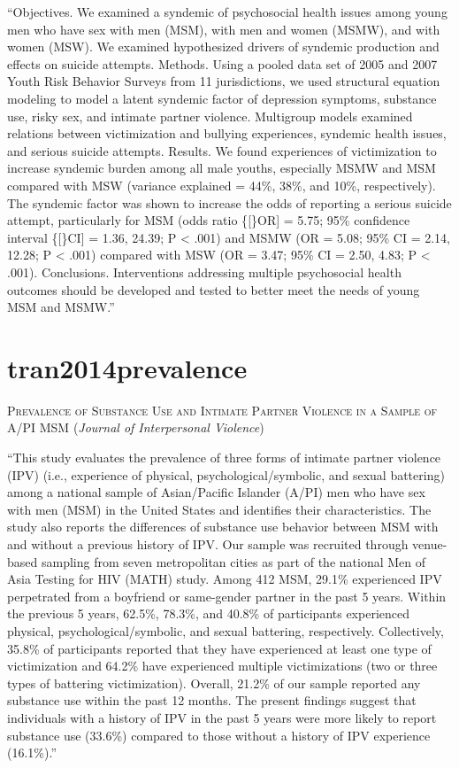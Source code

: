 \documentclass[]{tufte-handout}
\begin{document}
``Objectives. We examined a syndemic of psychosocial health issues among
young men who have sex with men (MSM), with men and women (MSMW), and
with women (MSW). We examined hypothesized drivers of syndemic
production and effects on suicide attempts. Methods. Using a pooled data
set of 2005 and 2007 Youth Risk Behavior Surveys from 11 jurisdictions,
we used structural equation modeling to model a latent syndemic factor
of depression symptoms, substance use, risky sex, and intimate partner
violence. Multigroup models examined relations between victimization and
bullying experiences, syndemic health issues, and serious suicide
attempts. Results. We found experiences of victimization to increase
syndemic burden among all male youths, especially MSMW and MSM compared
with MSW (variance explained = 44\%, 38\%, and 10\%, respectively). The
syndemic factor was shown to increase the odds of reporting a serious
suicide attempt, particularly for MSM (odds ratio \{{[}\}OR{]} = 5.75;
95\% confidence interval \{{[}\}CI{]} = 1.36, 24.39; P \textless{} .001)
and MSMW (OR = 5.08; 95\% CI = 2.14, 12.28; P \textless{} .001) compared
with MSW (OR = 3.47; 95\% CI = 2.50, 4.83; P \textless{} .001).
Conclusions. Interventions addressing multiple psychosocial health
outcomes should be developed and tested to better meet the needs of
young MSM and MSMW.''

\section{\texorpdfstring{\textcolor[HTML]{5b0057}{tran2014prevalence}}{}}\label{section-55}

\textsc{\large{Prevalence of Substance Use and Intimate Partner Violence in a Sample of A/PI MSM}}
(\emph{Journal of Interpersonal Violence})

``This study evaluates the prevalence of three forms of intimate partner
violence (IPV) (i.e., experience of physical, psychological/symbolic,
and sexual battering) among a national sample of Asian/Pacific Islander
(A/PI) men who have sex with men (MSM) in the United States and
identifies their characteristics. The study also reports the differences
of substance use behavior between MSM with and without a previous
history of IPV. Our sample was recruited through venue-based sampling
from seven metropolitan cities as part of the national Men of Asia
Testing for HIV (MATH) study. Among 412 MSM, 29.1\% experienced IPV
perpetrated from a boyfriend or same-gender partner in the past 5 years.
Within the previous 5 years, 62.5\%, 78.3\%, and 40.8\% of participants
experienced physical, psychological/symbolic, and sexual battering,
respectively. Collectively, 35.8\% of participants reported that they
have experienced at least one type of victimization and 64.2\% have
experienced multiple victimizations (two or three types of battering
victimization). Overall, 21.2\% of our sample reported any substance use
within the past 12 months. The present findings suggest that individuals
with a history of IPV in the past 5 years were more likely to report
substance use (33.6\%) compared to those without a history of IPV
experience (16.1\%).''
\end{document}
